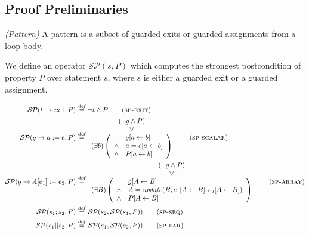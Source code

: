 \documentclass[a4paper,10pt]{article}
\newcommand{\KWexit}{\ensuremath{\mathrm{exit}}}
\newcommand{\update}[3]{\ensuremath{\mathit{update}{(#1,#2,#3)}}\xspace}
\newcommand{\symdef}{\ensuremath{\overset{\mathit{def}}{=}}}
\newcommand{\spexit}{\textsc{sp-exit}\xspace}
\newcommand{\spscalar}{\textsc{sp-scalar}\xspace}
\newcommand{\sparray}{\textsc{sp-array}\xspace}
\newcommand{\spseq}{\textsc{sp-seq}\xspace}
\newcommand{\sppar}{\textsc{sp-par}\xspace}
\newenvironment{definition}[1][Definition]{\begin{trivlist}
\item[\hskip \labelsep {\bfseries #1}]}{\end{trivlist}}
\begin{document}
\subsection{Proof Preliminaries}

\newcommand{\spostsym}{\ensuremath{\mathcal{SP}}\xspace}
\newcommand{\spost}[2]{\ensuremath{\spostsym(#1,#2)}}
\newcommand{\subst}[3]{\ensuremath{#1[#2 \leftarrow #3]}}

\begin{definition}
  \emph{(Pattern)} A pattern is a subset of guarded exits or guarded assignments
  from a loop body.
\end{definition}

We define an operator \spost{s}{P} which computes the strongest postcondition of
property $P$ over statement $s$, where $s$ is either a guarded
exit or a guarded assignment.

\begin{align*}
\spost{t \rightarrow \KWexit}{P} &\symdef \neg t \land P \tag{\spexit}\\
\spost{g \rightarrow a:=e}{P} &\symdef \begin{array}{cl}
(\neg g \land P) \\
\lor \\
(\exists b) \left(\begin{array}{cl}
                         & \subst{g}{a}{b}\\
                    \land& a = \subst{e}{a}{b} \\
                    \land& \subst{P}{a}{b}
                    \end{array}\right)
\end{array} \tag{\spscalar}\\
\spost{g \rightarrow A[e_1]:=e_2}{P} &\symdef \begin{array}{cl}
(\neg g \land P) \\
\lor \\
(\exists B) \left(\begin{array}{cl}
                       & \subst{g}{A}{B}\\
                  \land& A = \update{B}{\subst{e_1}{A}{B}}{\subst{e_2}{A}{B}}\\
                  \land& \subst{P}{A}{B}\\
                  \end{array}\right)
\end{array}\tag{\sparray}\\
\spost{s_1; s_2}{P} &\symdef \spost{s_2}{\spost{s_1}{P}} \tag{\spseq}\\
\spost{s_1||s_2}{P} &\symdef \spost{s_1}{\spost{s_2}{P}} \tag{\sppar}\\
\end{align*}
\end{document}
